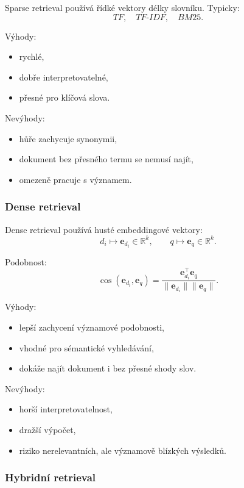 Sparse retrieval používá řídké vektory délky slovníku. Typicky:
\[
TF,\quad TF\text{-}IDF,\quad BM25.
\]

Výhody:
\begin{itemize}
    \item rychlé,
    \item dobře interpretovatelné,
    \item přesné pro klíčová slova.
\end{itemize}

Nevýhody:
\begin{itemize}
    \item hůře zachycuje synonymii,
    \item dokument bez přesného termu se nemusí najít,
    \item omezeně pracuje s významem.
\end{itemize}

\subsubsection{Dense retrieval}

Dense retrieval používá husté embeddingové vektory:
\[
d_i \mapsto \mathbf{e}_{d_i}\in\mathbb{R}^k,
\qquad
q \mapsto \mathbf{e}_q\in\mathbb{R}^k.
\]

Podobnost:
\[
\cos(\mathbf{e}_{d_i},\mathbf{e}_q)
=
\frac{\mathbf{e}_{d_i}^{\top}\mathbf{e}_q}
{\|\mathbf{e}_{d_i}\|\|\mathbf{e}_q\|}.
\]

Výhody:
\begin{itemize}
    \item lepší zachycení významové podobnosti,
    \item vhodné pro sémantické vyhledávání,
    \item dokáže najít dokument i bez přesné shody slov.
\end{itemize}

Nevýhody:
\begin{itemize}
    \item horší interpretovatelnost,
    \item dražší výpočet,
    \item riziko nerelevantních, ale významově blízkých výsledků.
\end{itemize}

\subsubsection{Hybridní retrieval}

